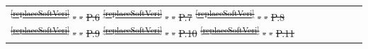 \documentclass[a4paper,12pt,twoside]{article}
\providecommand{\DIFdeltex}[1]{{\protect\color{red}\sout{#1}}}                      %
\providecommand{\DIFdel}[1]{\texorpdfstring{\DIFdeltex{#1}}{}} %
\begin{document}
\begin{longtable}[]{|m{}| m{} |m{} |m{}|m{}|}
\DIFdel{\textsuperscript{\ref{replaceSoftVeri}}                                                                                        }%
\DIFdel{-        }%
\DIFdel{-            }%
\DIFdel{P.6  }%
\DIFdel{\textsuperscript{\ref{replaceSoftVeri}}                                                                          }%
\DIFdel{-    }%
\DIFdel{-            }%
\DIFdel{P.7  }%
\DIFdel{\textsuperscript{\ref{replaceSoftVeri}}                                                                         }%
\DIFdel{-     }%
\DIFdel{-           }%
\DIFdel{P.8  }%
\DIFdel{\textsuperscript{\ref{replaceSoftVeri}}                                                                          }%
\DIFdel{-       }%
\DIFdel{-            }%
\DIFdel{P.9  }%
\DIFdel{\textsuperscript{\ref{replaceSoftVeri}}                                                                        }%
\DIFdel{-    }%
\DIFdel{-        }%
\DIFdel{P.10 }%
\DIFdel{\textsuperscript{\ref{replaceSoftVeri}}                                                                  }%
\DIFdel{-    }%
\DIFdel{-        }%
\DIFdel{P.11 }%

\end{longtable}
\end{document}
